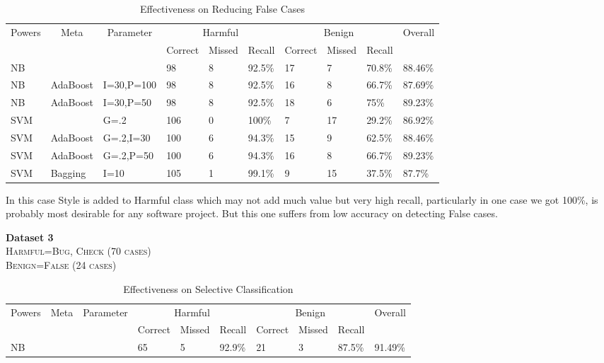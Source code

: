 \documentclass[nocopyrightspace]{sigplanconf}
\begin{document}
\begin{table*}[htb!]
\centering
\begin{tabularx}{\textwidth}{|X|X|X|X|X|X|X|X|X|X|}
\hline
\multicolumn{1}{|c|}{\multirow{2}{*}{Powers}} & 
\multicolumn{1}{|c|}{\multirow{2}{*}{Meta}} & 
\multicolumn{1}{|c|}{\multirow{2}{*}{Parameter}} & 
\multicolumn{3}{|c|}{Harmful} & 
\multicolumn{3}{|c|}{Benign} & 
\multicolumn{1}{|c|}{\multirow{2}{*}{Overall}} \\
\cline{4-9}

& & & Correct & Missed & Recall & Correct & Missed & Recall & \\
\hline
NB &  &  & 98 & 8 & 92.5\% & 17 & 7 & 70.8\% & 88.46\% \\ 
\hline 
NB & AdaBoost & I=30,P=100 & 98 & 8 & 92.5\% & 16 & 8 & 66.7\% & 87.69\%\\ 
\hline 
NB & AdaBoost & I=30,P=50 & 98 & 8 & 92.5\% & 18 & 6 & 75\% & 89.23\% \\ 
\hline 
SVM &  & G=.2 & 106 & 0 & 100\% & 7 & 17 & 29.2\% & 86.92\%\\ 
\hline 
SVM & AdaBoost & G=.2,I=30 & 100 & 6 & 94.3\% & 15 & 9 & 62.5\% & 88.46\%\\ 
\hline 
SVM & AdaBoost & G=.2,P=50 & 100 & 6 & 94.3\% & 16 & 8 & 66.7\% & 89.23\%\\ 
\hline 
SVM & Bagging & I=10 & 105 & 1 & 99.1\% & 9 & 15 & 37.5\% & 87.7\%\\
\hline
\end{tabularx}
\caption{Effectiveness on Reducing False Cases}
\label{tab:dataset2}
\end{table*}


\noindent
In this case Style is added to Harmful class which may not add much value but very high recall, particularly in one case we got 100\%, is probably most desirable for any software project. But this one suffers from low accuracy on detecting False cases.

\vspace{10 pt}
\noindent
\textbf{Dataset 3}\\
\textsc{Harmful=Bug, Check (70 cases)}\\
\textsc{Benign=False (24 cases)}\\

\begin{table*}[htb!]
\centering
\begin{tabularx}{\textwidth}{|X|X|X|X|X|X|X|X|X|X|}
\hline
\multicolumn{1}{|c|}{\multirow{2}{*}{Powers}} & 
\multicolumn{1}{|c|}{\multirow{2}{*}{Meta}} & 
\multicolumn{1}{|c|}{\multirow{2}{*}{Parameter}} & 
\multicolumn{3}{|c|}{Harmful} & 
\multicolumn{3}{|c|}{Benign} & 
\multicolumn{1}{|c|}{\multirow{2}{*}{Overall}} \\
\cline{4-9}

& & & Correct & Missed & Recall & Correct & Missed & Recall & \\
\hline
NB & & & 65 & 5 & 92.9\% & 21 & 3 & 87.5\% & 91.49\% \\
\hline
\end{tabularx}
\caption{Effectiveness on Selective Classification}
\label{tab:dataset3}
\end{table*}
\end{document}
